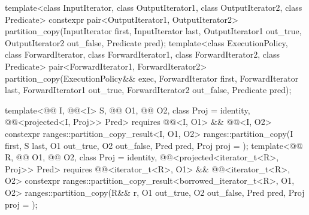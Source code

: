 %
\begin{itemdecl}
template<class InputIterator, class OutputIterator1, class OutputIterator2, class Predicate>
  constexpr pair<OutputIterator1, OutputIterator2>
    partition_copy(InputIterator first, InputIterator last,
                   OutputIterator1 out_true, OutputIterator2 out_false, Predicate pred);
template<class ExecutionPolicy, class ForwardIterator, class ForwardIterator1,
         class ForwardIterator2, class Predicate>
  pair<ForwardIterator1, ForwardIterator2>
    partition_copy(ExecutionPolicy&& exec,
                   ForwardIterator first, ForwardIterator last,
                   ForwardIterator1 out_true, ForwardIterator2 out_false, Predicate pred);

template<@@ I, @@<I> S, @@ O1, @@ O2,
         class Proj = identity, @@<projected<I, Proj>> Pred>
  requires @@<I, O1> && @@<I, O2>
  constexpr ranges::partition_copy_result<I, O1, O2>
    ranges::partition_copy(I first, S last, O1 out_true, O2 out_false, Pred pred,
                           Proj proj = {});
template<@@ R, @@ O1, @@ O2,
         class Proj = identity,
         @@<projected<iterator_t<R>, Proj>> Pred>
  requires @@<iterator_t<R>, O1> &&
           @@<iterator_t<R>, O2>
  constexpr ranges::partition_copy_result<borrowed_iterator_t<R>, O1, O2>
    ranges::partition_copy(R&& r, O1 out_true, O2 out_false, Pred pred, Proj proj = {});


\end{itemdecl}
